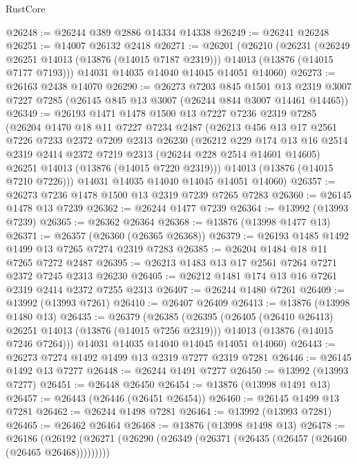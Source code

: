 \begin{lexlean}{RustCore}
\begin{coremodule}
@26248 := @26244 @389 @2886 @14334 @14338
@26249 := @26241 @26248
@26251 := @14007 @26132 @2418
@26271 := @26201
    (@26210
      (@26231
        (@26249 @26251 @14013 (@13876 (@14015 @7187 @2319)))
        @14013
        (@13876 (@14015 @7177 @7193)))
      @14031
      @14035
      @14040
      @14045
      @14051
      @14060)
@26273 := @26163 @2438 @14070
@26290 := @26273
    @7203
    @845
    @1501
    @13
    @2319
    @3007
    @7227
    @7285
    (@26145 @845 @13 @3007 (@26244 @844 @3007 @14461 @14465))
@26349 := @26193
    @1471
    @1478
    @1500
    @13
    @7227
    @7236
    @2319
    @7285
    (@26204
      @1470
      @18
      @11
      @7227
      @7234
      @2487
      (@26213
        @456
        @13
        @17
        @2561
        @7226
        @7233
        @2372
        @7209
        @2313
        @26230
        (@26212
          @229
          @174
          @13
          @16
          @2514
          @2319
          @2414
          @2372
          @7219
          @2313
          (@26244 @228 @2514 @14601 @14605)
          @26251
          @14013
          (@13876 (@14015 @7220 @2319)))
        @14013
        (@13876 (@14015 @7210 @7226)))
      @14031
      @14035
      @14040
      @14045
      @14051
      @14060)
@26357 := @26273 @7236 @1478 @1500 @13 @2319 @7239 @7265 @7283
@26360 := @26145 @1478 @13 @7239
@26362 := @26244 @1477 @7239
@26364 := @13992 (@13993 @7239)
@26365 := @26362 @26364
@26368 := @13876 (@13998 @1477 @13)
@26371 := @26357 (@26360 (@26365 @26368))
@26379 := @26193 @1485 @1492 @1499 @13 @7265 @7274 @2319 @7283
@26385 := @26204 @1484 @18 @11 @7265 @7272 @2487
@26395 := @26213 @1483 @13 @17 @2561 @7264 @7271 @2372 @7245 @2313 @26230
@26405 := @26212 @1481 @174 @13 @16 @7261 @2319 @2414 @2372 @7255 @2313
@26407 := @26244 @1480 @7261
@26409 := @13992 (@13993 @7261)
@26410 := @26407 @26409
@26413 := @13876 (@13998 @1480 @13)
@26435 := @26379
    (@26385
      (@26395
        (@26405 (@26410 @26413) @26251 @14013 (@13876 (@14015 @7256 @2319)))
        @14013
        (@13876 (@14015 @7246 @7264)))
      @14031
      @14035
      @14040
      @14045
      @14051
      @14060)
@26443 := @26273 @7274 @1492 @1499 @13 @2319 @7277 @2319 @7281
@26446 := @26145 @1492 @13 @7277
@26448 := @26244 @1491 @7277
@26450 := @13992 (@13993 @7277)
@26451 := @26448 @26450
@26454 := @13876 (@13998 @1491 @13)
@26457 := @26443 (@26446 (@26451 @26454))
@26460 := @26145 @1499 @13 @7281
@26462 := @26244 @1498 @7281
@26464 := @13992 (@13993 @7281)
@26465 := @26462 @26464
@26468 := @13876 (@13998 @1498 @13)
@26478 := @26186
    (@26192 (@26271 (@26290 (@26349 (@26371 (@26435 (@26457 (@26460 (@26465 @26468)))))))))

\end{coremodule}
\end{lexlean}
